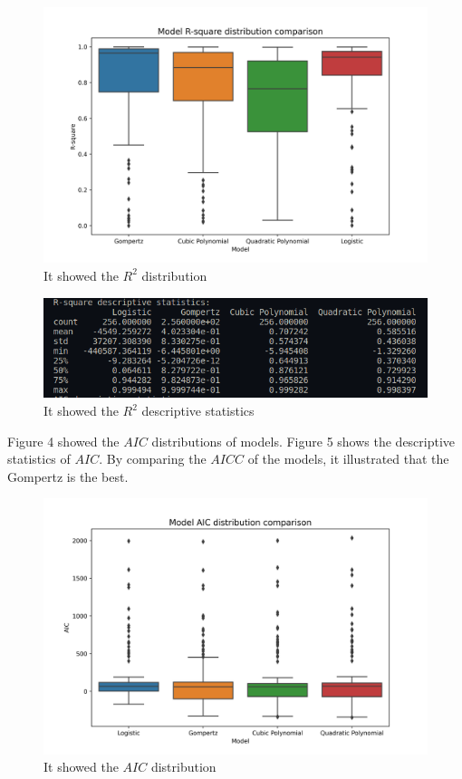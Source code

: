 \documentclass[11pt]{article}
\begin{document}
    \begin{figure}[H]
      \centering
      \includegraphics[width=\textwidth]{../results/Model_R2_distribution.png}
      \caption{It showed the $R^2$ distribution}
    \end{figure}

    \begin{figure}[H]
      \centering
      \includegraphics[width=\textwidth]{../sandbox/R-square descriptive statistics.png}
      \caption{It showed the $R^2$ descriptive statistics}
    \end{figure}

    Figure 4 showed the $AIC$ distributions of models. Figure 5 shows the descriptive statistics of $AIC$.
    By comparing the $AICC$ of the models, it illustrated that the Gompertz is the best.

    \begin{figure}[H]
      \centering
      \includegraphics[width=\textwidth]{../results/Model_AIC_distribution.png}
      \caption{It showed the $AIC$ distribution}
    \end{figure}
\end{document}
